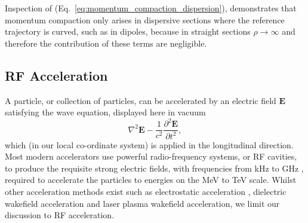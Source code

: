 \documentclass[../main.tex]{subfiles}
\begin{document}
Inspection of (Eq.~\ref{eq:momentum_compaction_dispersion}), demonstrates that momentum compaction only arises in dispersive sections where the reference trajectory is curved, such as in dipoles, because in straight sections $\rho\rightarrow\infty$ and therefore the contribution of these terms are negligible. 

\subsection{RF Acceleration}
\label{sec:RF_acceleration}

A particle, or collection of particles, can be accelerated by an electric field $\boldsymbol{E}$ satisfying the wave equation, displayed here in vacuum
\begin{equation}
\nabla^{2}\boldsymbol{E}-\frac{1}{c^{2}}\frac{\partial^{2}\boldsymbol{E}}{\partial t^{2}},
\label{eq:electromagnetic_wave_equation}    
\end{equation}
which (in our local co-ordinate system) is applied in the longitudinal direction. Most modern accelerators use powerful radio-frequency systems, or RF cavities, to produce the requisite strong electric fields, with frequencies from \si{\kilo\hertz} to \si{\giga\hertz} \cite{wille2000physics}, required to accelerate the particles to energies on the \si{\mega\electronvolt} to \si{\tera\electronvolt} scale. Whilst other acceleration methods exist such as electrostatic acceleration \cite{}, dielectric wakefield acceleration \cite{} and laser plasma wakefield acceleration, we limit our discussion to RF acceleration.
\end{document}
